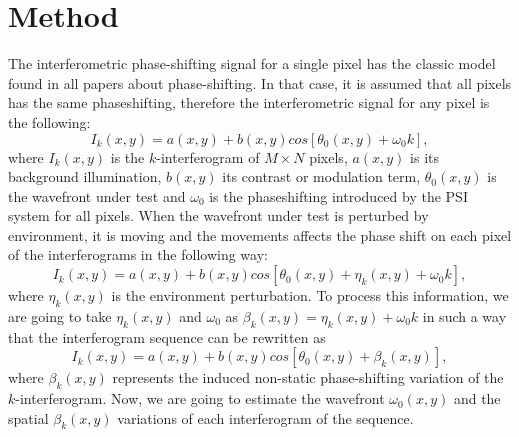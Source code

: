 \section{Method}
The interferometric phase-shifting signal for a single pixel has the classic
model found in all papers about phase-shifting. In that case, it is assumed that
all pixels has the same phaseshifting, therefore the interferometric signal for
any pixel is the following:
\begin{equation}
  I_k(x,y) = a(x,y)+b(x,y)cos[\theta_0(x,y) + \omega_0 k],
\end{equation}
where $I_k(x,y)$ is the $k$-interferogram of $M\times N$ pixels, $a(x,y)$ is its
background illumination, $b(x,y)$ its contrast or modulation term,
$\theta_0(x,y)$ is the wavefront under test and $\omega_0$ is the phaseshifting
introduced by the PSI system for all pixels. When the wavefront under test is
perturbed by environment, it is moving and the movements affects the phase shift
on each pixel of the interferograms in the following way:
\begin{equation}
  I_k(x,y) = a(x,y)+b(x,y)cos[\theta_0(x,y) + \eta_k(x,y) + \omega_0 k],
\end{equation}
where $\eta_k(x,y)$ is the environment perturbation. To process this
information, we are going to take $\eta_k(x,y)$ and $\omega_0$ as $\beta_k(x,y)
= \eta_k(x,y) + \omega_0 k$ in such a way that the interferogram sequence
can be rewritten as
\begin{equation}
  I_k(x,y) = a(x,y)+b(x,y)cos[\theta_0(x,y) + \beta_k(x,y)],
\end{equation}
where $\beta_k(x,y)$ represents the induced non-static phase-shifting variation
of the $k$-interferogram. Now, we are going to estimate the wavefront
$\omega_0(x,y)$ and the spatial $\beta_k(x,y)$ variations of each interferogram
of the sequence.

